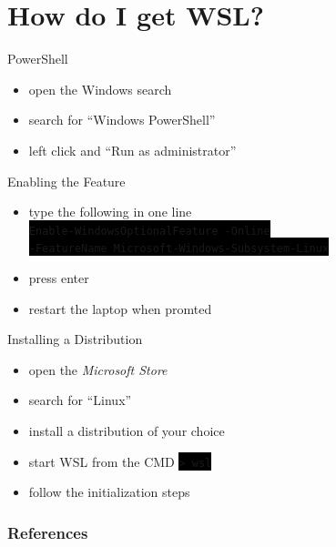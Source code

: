 \documentclass[10pt,graphics,aspectratio=169,table]{beamer}
\newcommand{\code}[0]{\lstinline[basicstyle=\ttfamily\color{white}]}
\newcommand{\cbox}[1]{\colorbox{black}{#1}}
\begin{document}
\section{How do I get WSL?}

\begin{frame}{PowerShell}
\begin{itemize}
    \item open the Windows search
    \item search for \enquote{Windows PowerShell}
    \item left click and \enquote{Run as administrator}
\end{itemize}
\end{frame}

\begin{frame}{Enabling the Feature}
\begin{itemize}
    \item type the following in one line \\
    \cbox{\code|Enable-WindowsOptionalFeature -Online|} \\
    \cbox{\code|-FeatureName Microsoft-Windows-Subsystem-Linux|} \\
    \item press enter
    \item restart the laptop when promted
\end{itemize}
\hfill\cite{installation}
\end{frame}

\begin{frame}{Installing a Distribution}
\begin{itemize}
    \item open the \textit{Microsoft Store}
    \item search for \enquote{Linux}
    \item install a distribution of your choice
    \item start WSL from the CMD \cbox{\code|> wsl|}
    \item follow the initialization steps
\end{itemize}
\hfill\cite{installation}
\end{frame}

\begin{frame}[allowframebreaks]
        \frametitle{References}
        
        \nocite{*}
        
\end{frame}
\end{document}
